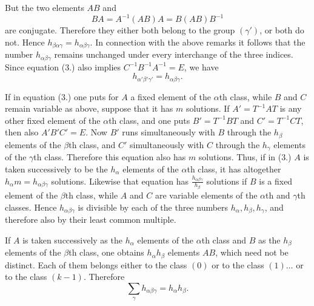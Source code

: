 \documentclass[11pt]{article}
\begin{document}
But the two elements $AB$ and
\begin{equation*}\tag{4.}
BA=A^{-1}(AB)A=B(AB)B^{-1}
\end{equation*}
are conjugate. Therefore they either both belong to the group $(\gamma')$, or both do not. Hence $h_{\beta\alpha\gamma}=h_{\alpha\beta\gamma}$. In connection with the above remarks it follows that the number $h_{\alpha\beta\gamma}$ remains unchanged under every interchange of the three indices. Since equation (3.) also implies $C^{-1}B^{-1}A^{-1}=E$, we have
\begin{equation*}\tag{5.}
h_{\alpha'\beta'\gamma'}=h_{\alpha\beta\gamma}.
\end{equation*}

If in equation (3.) one puts for $A$ a fixed element of the $\alpha$th class, while $B$ and $C$ remain variable as above, suppose that it has $m$ solutions. If $A'=T^{-1}AT$ is any other fixed element of the $\alpha$th class, and one puts $B'=T^{-1}BT$ and $C'=T^{-1}CT$, then also $A'B'C'=E$. Now $B'$ runs simultaneously with $B$ through the $h_\beta$ elements of the $\beta$th class, and $C'$ simultaneously with $C$ through the $h_\gamma$ elements of the $\gamma$th class. Therefore this equation also has $m$ solutions. Thus, if in (3.) $A$ is taken successively to be the $h_\alpha$ elements of the $\alpha$th class, it has altogether $h_\alpha m=h_{\alpha\beta\gamma}$ solutions. Likewise that equation has $\frac{h_{\alpha\beta\gamma}}{h_\beta}$ solutions if $B$ is a fixed element of the $\beta$th class, while $A$ and $C$ are variable elements of the $\alpha$th and $\gamma$th classes. Hence $h_{\alpha\beta\gamma}$ is divisible by each of the three numbers $h_\alpha,h_\beta,h_\gamma$, and therefore also by their least common multiple.

If $A$ is taken successively as the $h_\alpha$ elements of the $\alpha$th class and $B$ as the $h_\beta$ elements of the $\beta$th class, one obtains $h_\alpha h_\beta$ elements $AB$, which need not be distinct. Each of them belongs either to the class $(0)$ or to the class $(1)\ldots$ or to the class $(k-1)$. Therefore
\begin{equation*}\tag{6.}
\sum_\gamma h_{\alpha\beta\gamma}=h_\alpha h_\beta.
\end{equation*}
\end{document}
